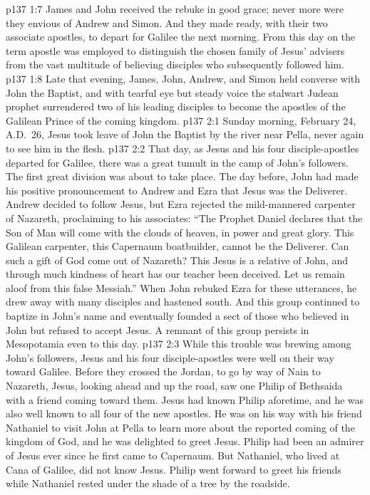 \vs p137 1:7 James and John received the rebuke in good grace; never more were they envious of Andrew and Simon. And they made ready, with their two associate apostles, to depart for Galilee the next morning. From this day on the term apostle was employed to distinguish the chosen family of Jesus’ advisers from the vast multitude of believing disciples who subsequently followed him.
\pc \vs p137 1:8 Late that evening, James, John, Andrew, and Simon held converse with John the Baptist, and with tearful eye but steady voice the stalwart Judean prophet surrendered two of his leading disciples to become the apostles of the Galilean Prince of the coming kingdom.\plusone
{}
\vs p137 2:1 Sunday morning, February 24, A.D.~26, Jesus took leave of John the Baptist by the river near Pella, never again to see him in the flesh.
\vs p137 2:2 That day, as Jesus and his four disciple\hyp{}apostles departed for Galilee, there was a great tumult in the camp of John’s followers. The first great division was about to take place. The day before, John had made his positive pronouncement to Andrew and Ezra that Jesus was the Deliverer. Andrew decided to follow Jesus, but Ezra rejected the mild\hyp{}mannered carpenter of Nazareth, proclaiming to his associates: “The Prophet Daniel declares that the Son of Man will come with the clouds of heaven, in power and great glory. This Galilean carpenter, this Capernaum boatbuilder, cannot be the Deliverer. Can such a gift of God come out of Nazareth? This Jesus is a relative of John, and through much kindness of heart has our teacher been deceived. Let us remain aloof from this false Messiah.” When John rebuked Ezra for these utterances, he drew away with many disciples and hastened south. And this group continued to baptize in John’s name and eventually founded a sect of those who believed in John but refused to accept Jesus. A remnant of this group persists in Mesopotamia even to this day.\plusone
\pc \vs p137 2:3 While this trouble was brewing among John’s followers, Jesus and his four disciple\hyp{}apostles were well on their way toward Galilee. Before they crossed the Jordan, to go by way of Nain to Nazareth, Jesus, looking ahead and up the road, saw one Philip of Bethsaida with a friend coming toward them. Jesus had known Philip aforetime, and he was also well known to all four of the new apostles. He was on his way with his friend Nathaniel to visit John at Pella to learn more about the reported coming of the kingdom of God, and he was delighted to greet Jesus. Philip had been an admirer of Jesus ever since he first came to Capernaum. But Nathaniel, who lived at Cana of Galilee, did not know Jesus. Philip went forward to greet his friends while Nathaniel rested under the shade of a tree by the roadside.
